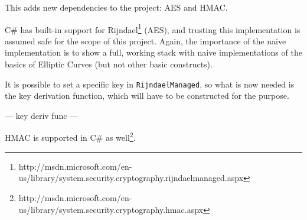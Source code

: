 This adds new dependencies to the project: AES and HMAC.

C\# has built-in support for Rijndael\footnote{http://msdn.microsoft.com/en-us/library/system.security.cryptography.rijndaelmanaged.aspx}
(AES), and trusting this implementation is assumed safe for the scope of this project. Again, the importance of the naive implementation
is to show a full, working stack with naive implementations of the basics of Elliptic Curves (but not other basic constructs).

It is possible to set a specific key in \verb+RijndaelManaged+, so what is now needed is the key derivation function, which will have to
be constructed for the purpose.

--- key deriv func ---

HMAC is supported in C\# as well\footnote{http://msdn.microsoft.com/en-us/library/system.security.cryptography.hmac.aspx}.